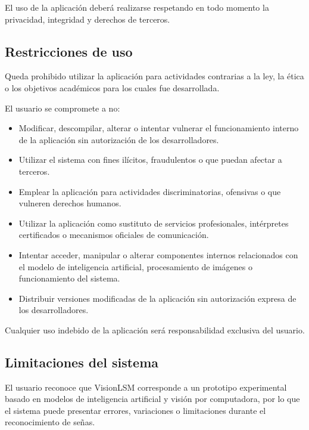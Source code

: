 	El uso de la aplicación deberá realizarse respetando en todo momento la privacidad, integridad y derechos de terceros.
	
	\subsection{Restricciones de uso}
	
	Queda prohibido utilizar la aplicación para actividades contrarias a la ley, la ética o los objetivos académicos para los cuales fue desarrollada.
	
	El usuario se compromete a no:
	
	\begin{itemize}
		\item Modificar, descompilar, alterar o intentar vulnerar el funcionamiento interno de la aplicación sin autorización de los desarrolladores.
		
		\item Utilizar el sistema con fines ilícitos, fraudulentos o que puedan afectar a terceros.
		
		\item Emplear la aplicación para actividades discriminatorias, ofensivas o que vulneren derechos humanos.
		
		\item Utilizar la aplicación como sustituto de servicios profesionales, intérpretes certificados o mecanismos oficiales de comunicación.
		
		\item Intentar acceder, manipular o alterar componentes internos relacionados con el modelo de inteligencia artificial, procesamiento de imágenes o funcionamiento del sistema.
		
		\item Distribuir versiones modificadas de la aplicación sin autorización expresa de los desarrolladores.
	\end{itemize}
	
	Cualquier uso indebido de la aplicación será responsabilidad exclusiva del usuario.
	
	\subsection{Limitaciones del sistema}
	
	El usuario reconoce que VisionLSM corresponde a un prototipo experimental basado en modelos de inteligencia artificial y visión por computadora, por lo que el sistema puede presentar errores, variaciones o limitaciones durante el reconocimiento de señas.
	
